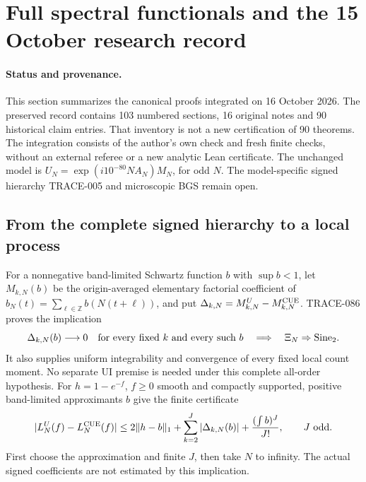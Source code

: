 \section{Full spectral functionals and the 15 October research record}
\label{sec:chat-integration-20261016}

\paragraph{Status and provenance.}
This section summarizes the canonical proofs integrated on 16 October 2026.
The preserved record contains 103 numbered sections, 16 original notes and
90 historical claim entries. That inventory is not a new certification of
90 theorems. The integration consists of the author's own check and fresh finite
checks, without an external referee or a new analytic Lean certificate.
The unchanged model is $U_N=\exp(i10^{-80}NA_N)M_N$, for odd $N$.
The model-specific signed hierarchy TRACE-005 and microscopic BGS remain open.

\subsection{From the complete signed hierarchy to a local process}
For a nonnegative band-limited Schwartz function $b$ with $\sup b<1$, let
$M_{k,N}(b)$ be the origin-averaged elementary factorial coefficient of
$b_N(t)=\sum_{\ell\in\mathbb Z}b(N(t+\ell))$, and put
$\Delta_{k,N}=M_{k,N}^U-M_{k,N}^{\rm CUE}$.
TRACE-086 proves the implication
\[
 \Delta_{k,N}(b)\longrightarrow0\quad
 \hbox{for every fixed $k$ and every such $b$}
 \quad\Longrightarrow\quad \Xi_N\Rightarrow\mathrm{Sine}_2.
\]
It also supplies uniform integrability and convergence of every fixed local
count moment. No separate UI premise is needed under this complete
all-order hypothesis. For $h=1-e^{-f}$, $f\ge0$ smooth and compactly supported,
positive band-limited approximants $b$ give the finite certificate
\[
 |L_N^U(f)-L_N^{\rm CUE}(f)|
 \le 2\|h-b\|_1+\sum_{k=2}^{J}|\Delta_{k,N}(b)|
       +\frac{(\int b)^J}{J!},\qquad J\text{ odd}.
\]
First choose the approximation and finite $J$, then take $N$ to infinity.
The actual signed coefficients are not estimated by this implication.

